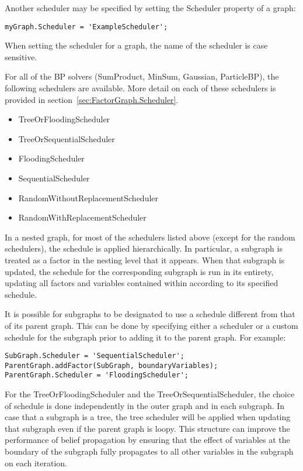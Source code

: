 Another scheduler may be specified by setting the Scheduler property of a graph:
\begin{lstlisting}
myGraph.Scheduler = 'ExampleScheduler';	
\end{lstlisting}

When setting the scheduler for a graph, the name of the scheduler is case sensitive.

For all of the BP solvers (SumProduct, MinSum, Gaussian, ParticleBP), the following schedulers are available.  More detail on each of these schedulers is provided in section~\ref{sec:FactorGraph.Scheduler}.

\begin{itemize}
\item TreeOrFloodingScheduler
\item TreeOrSequentialScheduler
\item FloodingScheduler
\item SequentialScheduler
\item RandomWithoutReplacementScheduler
\item RandomWithReplacementScheduler
\end{itemize}

In a nested graph, for most of the schedulers listed above (except for the random schedulers), the schedule is applied hierarchically.  In particular, a subgraph is treated as a factor in the nesting level that it appears.  When that subgraph is updated, the schedule for the corresponding subgraph is run in its entirety, updating all factors and variables contained within according to its specified schedule.

It is possible for subgraphs to be designated to use a schedule different from that of its parent graph.  This can be done by specifying either a scheduler or a custom schedule for the subgraph prior to adding it to the parent graph.  For example:
%
\begin{lstlisting}
SubGraph.Scheduler = 'SequentialScheduler';
ParentGraph.addFactor(SubGraph, boundaryVariables);
ParentGraph.Scheduler = 'FloodingScheduler';
\end{lstlisting}

For the TreeOrFloodingScheduler and the TreeOrSequentialScheduler, the choice of schedule is done independently in the outer graph and in each subgraph.  In case that a subgraph is a tree, the tree scheduler will be applied when updating that subgraph even if the parent graph is loopy.  This structure can improve the performance of belief propagation by ensuring that the effect of variables at the boundary of the subgraph fully propagates to all other variables in the subgraph on each iteration.

